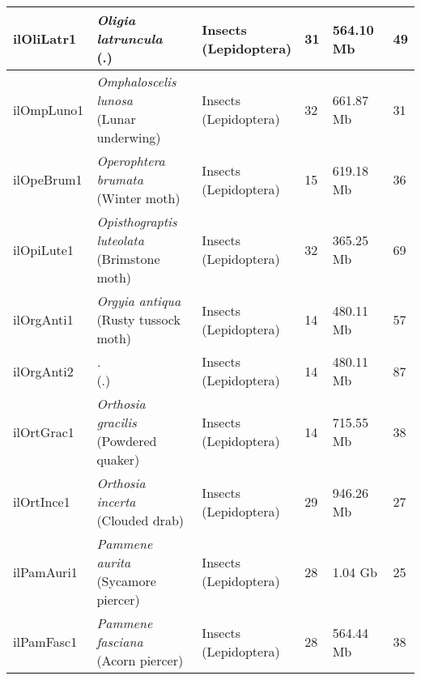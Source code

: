 \begin{centering}
\begin{longtable}{l|l|l|l|l|l}
ilOliLatr1 & \makecell[{l}]{\textit{Oligia latruncula} \\ (.)} & \makecell[{l}]{Insects \\ (Lepidoptera)} & 31 & 564.10 Mb & 49  \\ \hline
ilOmpLuno1 & \makecell[{l}]{\textit{Omphaloscelis lunosa} \\ (Lunar underwing)} & \makecell[{l}]{Insects \\ (Lepidoptera)} & 32 & 661.87 Mb & 31  \\ \hline
ilOpeBrum1 & \makecell[{l}]{\textit{Operophtera brumata} \\ (Winter moth)} & \makecell[{l}]{Insects \\ (Lepidoptera)} & 15 & 619.18 Mb & 36  \\ \hline
ilOpiLute1 & \makecell[{l}]{\textit{Opisthograptis luteolata} \\ (Brimstone moth)} & \makecell[{l}]{Insects \\ (Lepidoptera)} & 32 & 365.25 Mb & 69  \\ \hline
ilOrgAnti1 & \makecell[{l}]{\textit{Orgyia antiqua} \\ (Rusty tussock moth)} & \makecell[{l}]{Insects \\ (Lepidoptera)} & 14 & 480.11 Mb & 57  \\ \hline
ilOrgAnti2 & \makecell[{l}]{\textit{.} \\ (.)} & \makecell[{l}]{Insects \\ (Lepidoptera)} & 14 & 480.11 Mb & 87  \\ \hline
ilOrtGrac1 & \makecell[{l}]{\textit{Orthosia gracilis} \\ (Powdered quaker)} & \makecell[{l}]{Insects \\ (Lepidoptera)} & 14 & 715.55 Mb & 38  \\ \hline
ilOrtInce1 & \makecell[{l}]{\textit{Orthosia incerta} \\ (Clouded drab)} & \makecell[{l}]{Insects \\ (Lepidoptera)} & 29 & 946.26 Mb & 27  \\ \hline
ilPamAuri1 & \makecell[{l}]{\textit{Pammene aurita} \\ (Sycamore piercer)} & \makecell[{l}]{Insects \\ (Lepidoptera)} & 28 & 1.04 Gb & 25  \\ \hline
ilPamFasc1 & \makecell[{l}]{\textit{Pammene fasciana} \\ (Acorn piercer)} & \makecell[{l}]{Insects \\ (Lepidoptera)} & 28 & 564.44 Mb & 38  \\ \hline

\end{longtable}
\end{centering}
